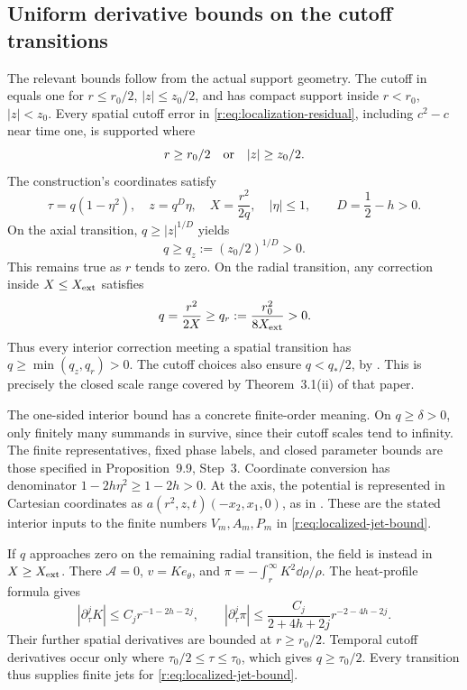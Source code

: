 \subsection{Uniform derivative bounds on the cutoff transitions}

The relevant bounds follow from the actual support geometry. The cutoff
in \cite[p.~118]{openai-paper} equals one for
\(r\le r_0/2\), \(|z|\le z_0/2\), and has compact support inside
\(r<r_0\), \(|z|<z_0\). Every spatial cutoff error in
\eqref{r:eq:localization-residual}, including \(c^2-c\) near time one,
is supported where
\[
 r\ge r_0/2\quad\hbox{or}\quad |z|\ge z_0/2.
\]
The construction's coordinates satisfy
\[
 \tau=q(1-\eta^2),\quad z=q^D\eta,\quad
 X=\frac{r^2}{2q},\quad |\eta|\le1,
 \qquad D=\frac12-h>0.
\]
On the axial transition, \(q\ge |z|^{1/D}\) yields
\[
 q\ge q_z:=(z_0/2)^{1/D}>0.
\]
This remains true as \(r\) tends to zero. On the radial transition,
any correction inside \(X\le X_{\rm ext}\) satisfies
\[
 q=\frac{r^2}{2X}\ge q_r:=\frac{r_0^2}{8X_{\rm ext}}>0.
\]
Thus every interior correction meeting a spatial transition has
\(q\ge\min(q_z,q_r)>0\). The cutoff choices also ensure
\(q<q_*/2\), by \cite[(10.3)]{openai-paper}. This is precisely the
closed scale range covered by Theorem~3.1(ii) of that paper.

The one-sided interior bound has a concrete finite-order meaning.
On \(q\ge\delta>0\), only finitely many summands in
\cite[(9.21)]{openai-paper} survive, since their cutoff scales tend to
infinity. The finite representatives, fixed phase labels, and closed
parameter bounds are those specified in Proposition~9.9, Step~3.
Coordinate conversion has denominator
\(1-2h\eta^2\ge1-2h>0\). At the axis, the potential is represented
in Cartesian coordinates as \(a(r^2,z,t)(-x_2,x_1,0)\), as in
\cite[(10.1)]{openai-paper}. These are the stated interior inputs to
the finite numbers \(V_m,A_m,P_m\) in \eqref{r:eq:localized-jet-bound}.

If \(q\) approaches zero on the remaining radial transition, the field
is instead in \(X\ge X_{\rm ext}\). There
\(\mathcal A=0\), \(v=K e_\theta\), and
\(\pi=-\int_r^\infty K^2\dd\rho/\rho\).
The heat-profile formula gives
\[
 |\partial_\tau^jK|\le C_jr^{-1-2h-2j},\qquad
 |\partial_\tau^j\pi|
 \le\frac{C_j}{2+4h+2j}r^{-2-4h-2j}.
\]
Their further spatial derivatives are bounded at \(r\ge r_0/2\).
Temporal cutoff derivatives occur only where
\(\tau_0/2\le\tau\le\tau_0\), which gives \(q\ge\tau_0/2\).
Every transition thus supplies finite jets for
\eqref{r:eq:localized-jet-bound}.

